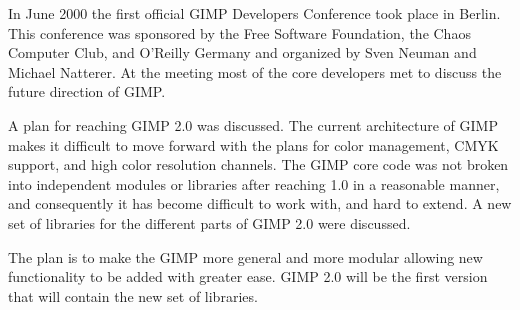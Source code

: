 In June 2000 the first official GIMP Developers Conference took place in
Berlin. This conference was sponsored by the Free Software Foundation, the
Chaos Computer Club, and O'Reilly Germany and organized by Sven Neuman and
Michael Natterer. At the meeting most of the core developers met to discuss the
future direction of GIMP.

A plan for reaching GIMP 2.0 was discussed. The current architecture of GIMP
makes it difficult to move forward with the plans for color management, CMYK
support, and high color resolution channels. The GIMP core code was not broken
into independent modules or libraries after reaching 1.0 in a reasonable
manner, and consequently it has become difficult to work with, and hard to
extend. A new set of libraries for the different parts of GIMP 2.0 were
discussed.

The plan is to make the GIMP more general and more modular allowing new
functionality to be added with greater ease. GIMP 2.0 will be the first version
that will contain the new set of libraries.
